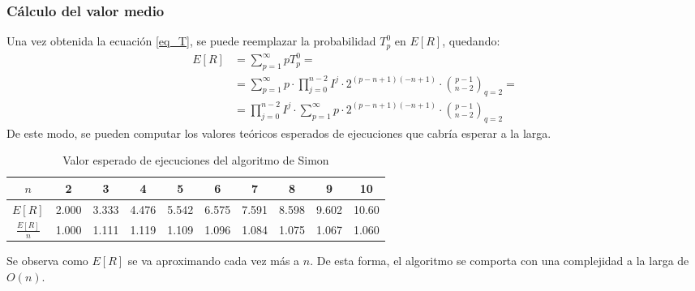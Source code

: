 \subsubsection{Cálculo del valor medio}
Una vez obtenida la ecuación \eqref{eq_T}, se puede reemplazar la probabilidad 
$T_p^0$ en $E[R]$, quedando:
%
\begin{equation}
\begin{split}
	E[R] &= \sum_{p=1}^\infty p T^0_p =\\
	&= \sum_{p=1}^\infty p \cdot \prod^{n-2}_{j=0} I^j \cdot 2^{(p-n+1)(-n+1)} 
\cdot {p-1 \choose n-2}_{q=2} = \\
	&= \prod^{n-2}_{j=0} I^j \cdot \sum_{p=1}^\infty p \cdot 2^{(p-n+1)(-n+1)} 
\cdot {p-1 \choose n-2}_{q=2}
\end{split}
\end{equation}
%
De este modo, se pueden computar los valores teóricos esperados de ejecuciones 
que cabría esperar a la larga.
\begin{table}[h]
	\centering
	\begin{tabular}{c*{9}{c}}
		\toprule
		$n$      & 2 & 3 & 4 & 5 & 6 & 7 & 8 & 9 & 10\\ \midrule
		$E[R]$   &
2.000& 3.333& 4.476& 5.542& 6.575& 7.591& 8.598& 9.602& 10.60
\\
		$\frac{E[R]}{n}$ &
1.000& 1.111& 1.119& 1.109& 1.096& 1.084& 1.075& 1.067& 1.060\\
		\bottomrule
	\end{tabular}
\caption{Valor esperado de ejecuciones del algoritmo de Simon}
\label{tabla_E}
\end{table}
%

Se observa como $E[R]$ se va aproximando cada vez más a $n$. De esta forma, el 
algoritmo se comporta con una complejidad a la larga de $O(n)$.
